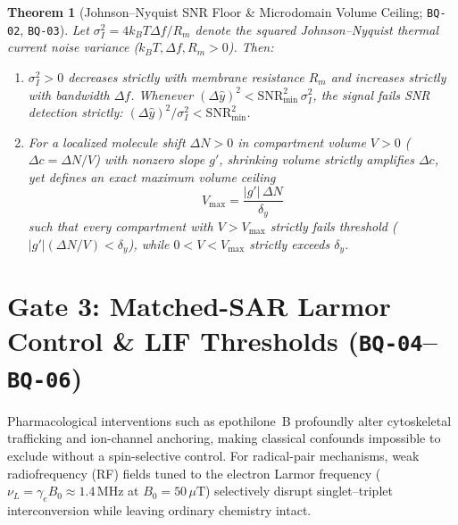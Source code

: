 \documentclass[11pt,a4paper]{article}
\theoremstyle{plain}
\newtheorem{theorem}{Theorem}[section]
\theoremstyle{remark}
\newcommand{\code}[1]{\texttt{\small #1}}
\begin{document}
\begin{theorem}[Johnson--Nyquist SNR Floor \& Microdomain Volume Ceiling; \code{BQ-02}, \code{BQ-03}]
Let $\sigma_I^2 = 4k_B T\Delta f / R_m$ denote the squared Johnson--Nyquist thermal current noise variance ($k_B T, \Delta f, R_m > 0$). Then:
\begin{enumerate}
  \item $\sigma_I^2 > 0$ decreases strictly with membrane resistance $R_m$ and increases strictly with bandwidth $\Delta f$. Whenever $(\Delta\hat{y})^2 < \mathrm{SNR}_{\min}^2\,\sigma_I^2$, the signal fails SNR detection strictly: $(\Delta\hat{y})^2/\sigma_I^2 < \mathrm{SNR}_{\min}^2$.
  \item For a localized molecule shift $\Delta N > 0$ in compartment volume $V > 0$ ($\Delta c = \Delta N/V$) with nonzero slope $g'$, shrinking volume strictly amplifies $\Delta c$, yet defines an exact maximum volume ceiling
  \begin{equation}
    V_{\max} = \frac{|g'|\,\Delta N}{\delta_y}
  \end{equation}
  such that every compartment with $V > V_{\max}$ strictly fails threshold ($|g'|(\Delta N/V) < \delta_y$), while $0 < V < V_{\max}$ strictly exceeds $\delta_y$.
\end{enumerate}
\end{theorem}

\section{Gate 3: Matched-SAR Larmor Control \& LIF Thresholds (\code{BQ-04}--\code{BQ-06})}

Pharmacological interventions such as epothilone~B profoundly alter cytoskeletal trafficking and ion-channel anchoring, making classical confounds impossible to exclude without a spin-selective control. For radical-pair mechanisms, weak radiofrequency (RF) fields tuned to the electron Larmor frequency ($\nu_L = \gamma_e B_0 \approx 1.4\,\mathrm{MHz}$ at $B_0 = 50\,\mu\mathrm{T}$) selectively disrupt singlet--triplet interconversion while leaving ordinary chemistry intact.
\end{document}
